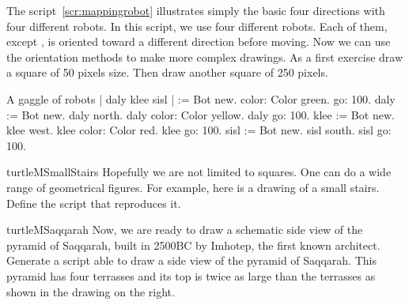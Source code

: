 The script~\ref{scr:mappingrobot} illustrates simply the basic four directions with four different robots. In this script, we use four different robots. Each of them, except
\caro, is oriented toward a different direction before moving. Now we can use the orientation methods to make more complex drawings. As a first exercise draw  a square of 50 pixels size. Then draw another square of 250 pixels.  

\begin{scriptwithtitle}{A gaggle of robots}\label{scr:mappingrobot}
| \caro daly klee sisl |
\caro := Bot new.
\caro color: Color green.
\caro go: 100.
daly := Bot new.
daly north.
daly color: Color yellow.
daly go: 100.
klee := Bot new.
klee west.
klee color: Color red.
klee go: 100.
sisl := Bot new.
sisl south.
sisl go: 100.
\end{scriptwithtitle}


\begin{exofig}{turtleMSmallStairs}
Hopefully we are not limited to squares. One can do a wide range of geometrical figures. For example, here is a drawing of a small stairs. Define the script that reproduces it.
\end{exofig}








\begin{exofig}{turtleMSaqqarah} \label{exo:saqqarah}
Now, we are ready to draw a schematic side view of the pyramid of
Saqqarah, built in 2500BC by Imhotep, the first known architect.
Generate a script able to draw a side view of the pyramid of
Saqqarah. This pyramid has four terrasses and its top is twice as
large than the terrasses as shown in the drawing on the right.
\end{exofig}

